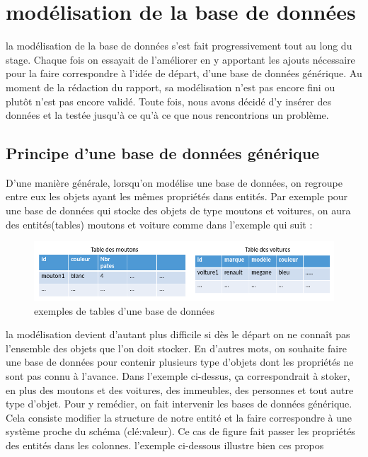 \section{modélisation de la base de données}
la modélisation de la base de données s'est fait progressivement tout au long du stage. Chaque fois on essayait de l'améliorer en y apportant les ajouts nécessaire pour la faire correspondre à l'idée de départ, d'une base de données générique. Au moment de la rédaction du rapport, sa modélisation n'est pas encore fini ou plutôt n'est pas encore validé. Toute fois, nous avons décidé d'y insérer des données et la testée jusqu'à ce qu'à ce que nous rencontrions un problème.
\subsection{Principe d'une base de données générique}
D'une manière générale, lorsqu'on modélise une base de données, on regroupe entre eux les objets ayant les mêmes propriétés dans entités. Par exemple pour une base de données qui stocke des objets de type moutons et voitures, on aura des entités(tables) moutons et voiture comme dans l'exemple qui suit : 

\begin{figure}[h!]
\begin{center}
\includegraphics[width=1\textwidth]{images/bd_image1.png}
\end{center}
\caption{exemples de tables d'une base de données}
\label{exemples de tables d'une base de données}
\end{figure}

la modélisation devient d'autant plus difficile si dès le départ on ne connaît pas l'ensemble des objets que l'on doit stocker. En d'autres mots, on souhaite faire une base de données pour contenir plusieurs type d'objets dont les propriétés ne sont pas connu à l'avance. Dans l'exemple ci-dessus, ça correspondrait à stoker, en plus des moutons et des voitures, des immeubles, des personnes et tout autre type d'objet. Pour y remédier, on fait intervenir les bases de données générique. Cela consiste modifier la structure de notre entité et la faire correspondre à une système proche du schéma (clé:valeur). Ce cas de figure fait passer les propriétés des entités dans les colonnes.
l'exemple ci-dessous illustre bien ces propos


